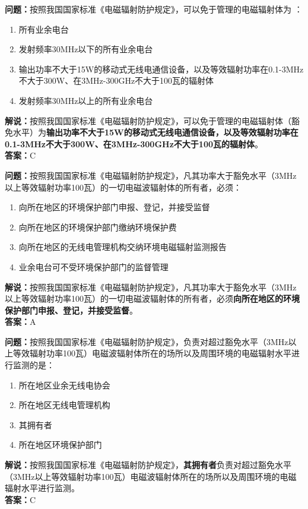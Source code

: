 \bigskip


\noindent\textbf{问题：}按照我国国家标准《电磁辐射防护规定》，可以免于管理的电磁辐射体为 ：
\begin{enumerate}[label=\Alph*), leftmargin=3em]
	\item 所有业余电台
	\item 发射频率30MHz以下的所有业余电台
	\item 输出功率不大于15W的移动式无线电通信设备，以及等效辐射功率在0.1-3MHz不大于300W、在3MHz-300GHz不大于100瓦的辐射体
	\item 发射频率30MHz以上的所有业余电台
\end{enumerate}
\noindent\textbf{解说：}按照我国国家标准《电磁辐射防护规定》，可以免于管理的电磁辐射体（豁免水平）为\textbf{输出功率不大于15W的移动式无线电通信设备，以及等效辐射功率在0.1-3MHz不大于300W、在3MHz-300GHz不大于100瓦的辐射体}。\\
\textbf{答案：}C


\bigskip


\noindent\textbf{问题：}按照我国国家标准《电磁辐射防护规定》，凡其功率大于豁免水平（3MHz以上等效辐射功率100瓦）的一切电磁波辐射体的所有者，必须：
\begin{enumerate}[label=\Alph*), leftmargin=3em]
	\item 向所在地区的环境保护部门申报、登记，并接受监督
	\item 向所在地区的环境保护部门缴纳环境保护费
	\item 向所在地区的无线电管理机构交纳环境电磁辐射监测报告
	\item 业余电台可不受环境保护部门的监督管理
\end{enumerate}
\noindent\textbf{解说：}按照我国国家标准《电磁辐射防护规定》，凡其功率大于豁免水平（3MHz以上等效辐射功率100瓦）的一切电磁波辐射体的所有者，必须\textbf{向所在地区的环境保护部门申报、登记，并接受监督}。\\
\textbf{答案：}A
\bigskip


\noindent\textbf{问题：}按照我国国家标准《电磁辐射防护规定》，负责对超过豁免水平（3MHz以上等效辐射功率100瓦）电磁波辐射体所在的场所以及周围环境的电磁辐射水平进行监测的是：
\begin{enumerate}[label=\Alph*), leftmargin=3em]
	\item 所在地区业余无线电协会
	\item 所在地区无线电管理机构
	\item 其拥有者
	\item 所在地区环境保护部门
\end{enumerate}
\noindent\textbf{解说：}按照我国国家标准《电磁辐射防护规定》，\textbf{其拥有者}负责对超过豁免水平（3MHz以上等效辐射功率100瓦）电磁波辐射体所在的场所以及周围环境的电磁辐射水平进行监测。\\
\textbf{答案：}C


